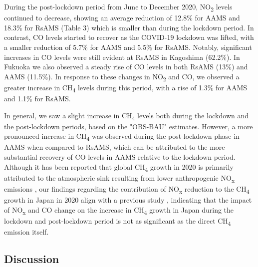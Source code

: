 During the post-lockdown period from June to December 2020, NO\textsubscript{2} levels continued to decrease, showing an average reduction of 12.8\% for AAMS and 18.3\% for RsAMS (Table 3) which is smaller than during the lockdown period. In contrast, CO levels started to recover as the COVID-19 lockdown was lifted, with a smaller reduction of 5.7\% for AAMS and 5.5\% for RsAMS. Notably, significant increases in CO levels were still evident at RsAMS in Kagoshima (62.2\%). In Fukuoka we also observed a steady rise of CO levels in both RsAMS (13\%) and AAMS (11.5\%). In response to these changes in NO\textsubscript{2} and CO, we observed a greater increase in CH\textsubscript{4} levels during this period, with a rise of 1.3\% for AAMS and 1.1\% for RsAMS.\par
In general, we saw a slight increase in CH\textsubscript{4} levels both during the lockdown and the post-lockdown periods, based on the "OBS-BAU" estimates. However, a more pronounced increase in CH\textsubscript{4} was observed during the post-lockdown phase in AAMS when compared to RsAMS, which can be attributed to the more substantial recovery of CO levels in AAMS relative to the lockdown period. Although it has been reported that global CH\textsubscript{4} growth in 2020 is primarily attributed to the atmospheric sink resulting from lower anthropogenic NO\textsubscript{x} emissions \citep{stevenson2022covid,peng2022wetland}, our findings regarding the contribution of NO\textsubscript{x} reduction to the CH\textsubscript{4} growth in Japan in 2020 align with a previous study \citep{akimoto2022rethinking,qu2022attribution,feng2023methane}, indicating that the impact of NO\textsubscript{x} and CO change on the increase in CH\textsubscript{4} growth in Japan during the lockdown and post-lockdown period is not as significant as the direct CH\textsubscript{4} emission itself. \par

\subsection{Discussion} \label{chap4_disscussion}
